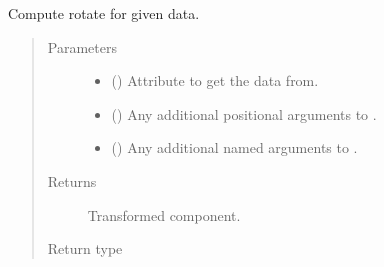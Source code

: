 \documentclass[letterpaper,10pt,english]{sphinxmanual}
\begin{document}
\begin{fulllineitems}
\begin{fulllineitems}
\label{\detokenize{api/base_classes:geology.src.base_spatial.SpatialComponent.rotate}}
Compute rotate for given data.
\begin{quote}\begin{description}
\item[{Parameters}] \leavevmode\begin{itemize}
\item {} 
 (\sphinxstyleliteralemphasis{\sphinxupquote{, }}) \textendash{} Attribute to get the data from.

\item {} 
 () \textendash{} Any additional positional arguments to .

\item {} 
 () \textendash{} Any additional named arguments to .

\end{itemize}

\item[{Returns}] \leavevmode
{} \textendash{} Transformed component.

\item[{Return type}] \leavevmode
{\hyperref[\detokenize{api/base_classes:geology.src.base_spatial.SpatialComponent}]{}}

\end{description}\end{quote}

\end{fulllineitems}



\end{fulllineitems}
\end{document}
